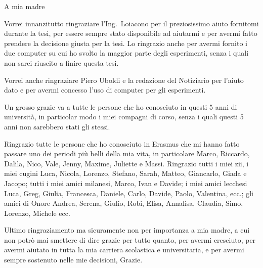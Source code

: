 \documentclass[12pt, italian]{toptesi}
\begin{document}
\frontespizio

\paginavuota
\begin{dedica}
       A mia madre
\end{dedica}

\ringraziamenti

Vorrei innanzitutto ringraziare l'Ing.~Loiacono per il preziosissimo aiuto fornitomi durante la tesi, per essere sempre stato disponibile ad aiutarmi e per avermi fatto prendere la decisione giusta per la tesi. 
Lo ringrazio anche per avermi fornito i due computer su cui ho svolto la maggior parte degli esperimenti, senza i quali non sarei riuscito a finire questa tesi.

Vorrei anche ringraziare Piero Uboldi e la redazione del Notiziario per l'aiuto dato e per avermi concesso l'uso di computer per gli esperimenti.

Un grosso grazie va a tutte le persone che ho conosciuto in questi 5 anni di università, in particolar modo i miei compagni di corso, senza i quali questi 5 anni non sarebbero stati gli stessi.

Ringrazio tutte le persone che ho conosciuto in Erasmus che mi hanno fatto passare uno dei periodi più belli della mia vita, in particolare Marco, Riccardo, Dalila, Nico, Vale, Jenny, Maxime, Juliette e Massi.
Ringrazio tutti i miei zii, i miei cugini Luca, Nicola, Lorenzo, Stefano, Sarah, Matteo, Giancarlo, Giada e Jacopo; tutti i miei amici milanesi, Marco, Ivan e Davide; i miei amici lecchesi Luca, Greg, Giulia, Francesca, Daniele, Carlo, Davide, Paolo, Valentina, ecc.; gli amici di Onore Andrea, Serena, Giulio, Robi, Elisa, Annalisa, Claudia, Simo, Lorenzo, Michele ecc.

Ultimo ringraziamento ma sicuramente non per importanza a mia madre, a cui non potrò mai smettere di dire grazie per tutto quanto,  per avermi cresciuto, per avermi aiutato in tutta la mia carriera scolastica e universitaria, e per avermi sempre sostenuto nelle mie decisioni, Grazie.

\indici

\listoffigures
\listoftables

\abstract
\end{document}
